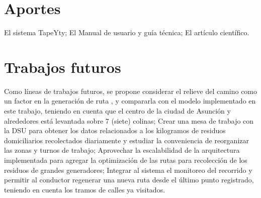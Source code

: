 \documentclass[a0,portrait, final]{a0poster}
\begin{document}
\begin{multicols}{2}

\section*{Aportes}
El sistema TapeYty; El Manual de usuario y guía técnica; El artículo científico.

\section*{Trabajos futuros}

Como líneas de trabajos futuros, se propone considerar el relieve del camino como un factor en la generación de ruta \cite{Sulemana2018OptimalMethods}, y compararla con el modelo implementado en este trabajo, teniendo en cuenta que el centro de la ciudad de Asunción y alrededores está levantada sobre 7 (siete) colinas; Crear una mesa de trabajo con la DSU para obtener los datos relacionados a los kilogramos de residuos domiciliarios recolectados diariamente y estudiar la conveniencia de reorganizar las zonas y turnos de trabajo; Aprovechar la escalabilidad de la arquitectura implementada para agregar la optimización de las rutas para recolección de los residuos de grandes generadores; Integrar al sistema el monitoreo del recorrido y permitir al conductor regenerar una nueva ruta desde el último punto registrado, teniendo en cuenta los tramos de calles ya visitados.




\end{multicols}
\end{document}
